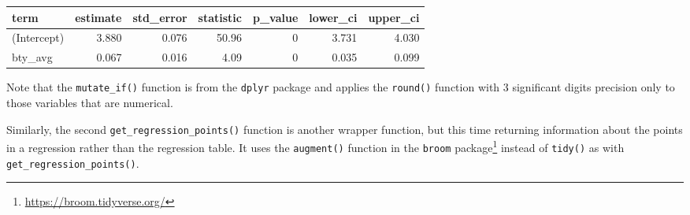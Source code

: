 \documentclass[12pt, krantz2,]{krantz}
\makeatletter
\newenvironment{Shaded}{\begin{snugshade}}{\end{snugshade}}
\newcommand{\DataTypeTok}[1]{\textcolor[rgb]{0.27,0.27,0.27}{#1}}
\newcommand{\DecValTok}[1]{\textcolor[rgb]{0.06,0.06,0.06}{#1}}
\newcommand{\KeywordTok}[1]{\textcolor[rgb]{0.27,0.27,0.27}{\textbf{#1}}}
\newcommand{\NormalTok}[1]{#1}
\newcommand{\OperatorTok}[1]{\textcolor[rgb]{0.43,0.43,0.43}{\textbf{#1}}}
\newcommand{\StringTok}[1]{\textcolor[rgb]{0.5,0.5,0.5}{#1}}
\renewcommand{\href}[2]{#2\footnote{\url{#1}}}
\newenvironment{kframe}{%
\medskip{}
\setlength{\fboxsep}{.8em}
 \def\at@end@of@kframe{}%
 \ifinner\ifhmode%
  \def\at@end@of@kframe{\end{minipage}}%
  \begin{minipage}{\columnwidth}%
 \fi\fi%
 \def\FrameCommand##1{\hskip\@totalleftmargin \hskip-\fboxsep
 \colorbox{shadecolor}{##1}\hskip-\fboxsep
     \hskip-\linewidth \hskip-\@totalleftmargin \hskip\columnwidth}%
 \MakeFramed {\advance\hsize-\width
   \@totalleftmargin\z@ \linewidth\hsize
   \@setminipage}}%
 {\par\unskip\endMakeFramed%
 \at@end@of@kframe}
\renewenvironment{Shaded}{\begin{kframe}}{\end{kframe}}
\makeatother
\begin{document}
\begin{table}[H]
\centering\begingroup\fontsize{10}{12}\selectfont

\begin{tabular}{l|r|r|r|r|r|r}
\hline
term & estimate & std\_error & statistic & p\_value & lower\_ci & upper\_ci\\
\hline
(Intercept) & 3.880 & 0.076 & 50.96 & 0 & 3.731 & 4.030\\
\hline
bty\_avg & 0.067 & 0.016 & 4.09 & 0 & 0.035 & 0.099\\
\hline
\end{tabular}
\endgroup{}
\end{table}

Note that the \texttt{mutate\_if()} function is from the \texttt{dplyr} package and applies the \texttt{round()} function with 3 significant digits precision only to those variables that are numerical.

Similarly, the second \texttt{get\_regression\_points()} function is another wrapper function, but this time returning information about the points in a regression rather than the regression table. It uses the \texttt{augment()} function in the \href{https://broom.tidyverse.org/}{\texttt{broom} package} instead of \texttt{tidy()} as with \texttt{get\_regression\_points()}.

\begin{Shaded}
\end{Shaded}
\end{document}
